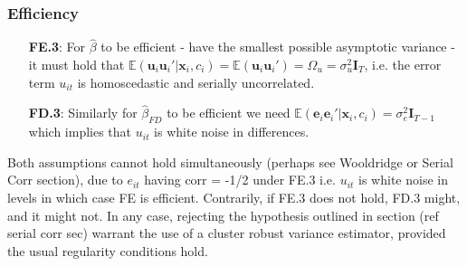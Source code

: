 \subsubsection*{Efficiency}

\begin{itemize}
    \item [\textbf{FE.3}:] For $\hat{\beta}$ to be efficient - have the smallest possible asymptotic variance - it must hold that $\mathbb{E}(\bm{u}_i \bm{u}_i' | \bm{x}_i, c_i) = \mathbb{E}(\bm{u}_i \bm{u}_i') = \Omega_{u} = \sigma^2_u \bm{I}_T$, i.e. the error term $u_{it}$ is homoscedastic and serially uncorrelated. 
    \item [\textbf{FD.3}:] Similarly for $\hat{\beta}_{FD}$ to be efficient we need $\mathbb{E}(\bm{e}_i \bm{e}_{i}'|\bm{x}_i, c_i) = \sigma^{2}_{e} \bm{I}_{T-1}$ which implies that $u_{it}$ is white noise in differences. 
\end{itemize}
Both assumptions cannot hold simultaneously (perhaps see Wooldridge or Serial Corr section), due to $e_{it}$ having corr = -1/2 under FE.3 i.e. $u_{it}$ is white noise in levels in which case FE is efficient. Contrarily, if FE.3 does not hold, FD.3 might, and it might not. In any case, rejecting the hypothesis outlined in section (ref serial corr sec) warrant the use of a cluster robust variance estimator, provided the usual regularity conditions hold.


